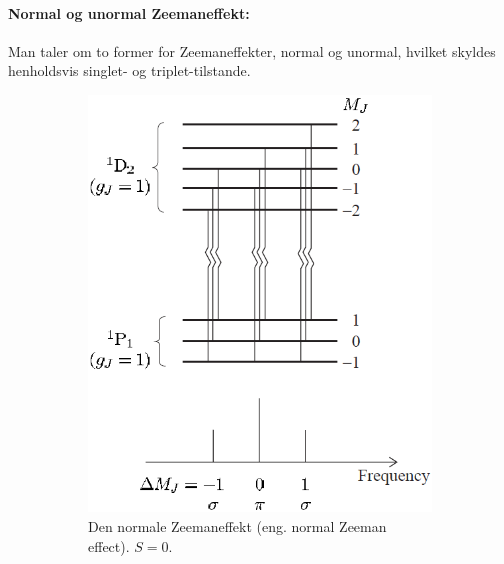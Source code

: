 \paragraph{Normal og unormal Zeemaneffekt:} Man taler om to former for Zeemaneffekter, normal og unormal, hvilket skyldes henholdsvis singlet- og triplet-tilstande.

\begin{figure}[!h]
    \centering
    \begin{subfigure}[t]{0.46\textwidth}
        \centering
        \includegraphics[width=\columnwidth]{Q15/images/NormalZeemanEffect.PNG}
        \caption{Den normale Zeemaneffekt (eng. normal Zeeman effect). $S = 0$.}
        \label{fig:Q15_NormalZeemanEffect}
    \end{subfigure}
    \hfill
    \begin{subfigure}[t]{0.46\textwidth}
        \centering

\end{subfigure}
\end{figure}
